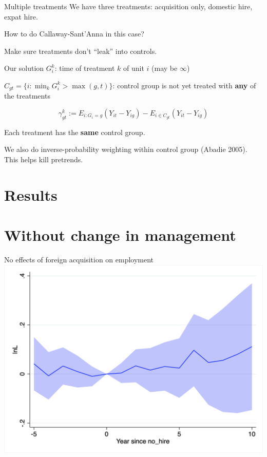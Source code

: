 \documentclass[
  ignorenonframetext,
  aspectratio=43,
]{beamer}
\begin{document}
\begin{frame}{Multiple treatments}
\protect\hypertarget{multiple-treatments}{}
We have three treatments: acquisition only, domestic hire, expat hire.

How to do Callaway-Sant'Anna in this case?

Make sure treatments don't ``leak'' into controls.
\end{frame}

\begin{frame}{Our solution}
\protect\hypertarget{our-solution}{}
\(G_{i}^k\): time of treatment \(k\) of unit \(i\) (may be \(\infty\))

\(C_{gt} = \{i: \min_k G_i^k > \max(g,t)\}\): control group is not yet
treated with \textbf{any} of the treatments

\[
\gamma_{gt}^k := E_{i: G_i=g} (Y_{it} - Y_{ig})
- E_{i\in C_{gt}} (Y_{it} - Y_{ig})
\]

Each treatment has the \textbf{same} control group.

We also do inverse-probability weighting within control group (Abadie
2005). This helps kill pretrends.
\end{frame}

\hypertarget{results}{%
\section{Results}\label{results}}

\hypertarget{without-change-in-management}{%
\section{Without change in
management}\label{without-change-in-management}}

\begin{frame}{No effects of foreign acquisition on employment}
\protect\hypertarget{no-effects-of-foreign-acquisition-on-employment}{}
\includegraphics{figure/event_study/no_hire_lnL.png}
\end{frame}
\end{document}
